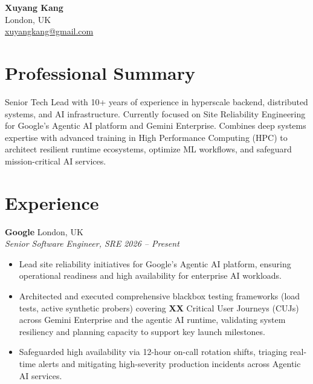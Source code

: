\documentclass[10pt,a4paper]{article}
\newcommand{\entry}[4]{
  \textbf{#1} \hfill #2 \\
  \textit{#3} \hfill \textit{#4}
}
\begin{document}
\begin{center}
    {\Huge \textbf{Xuyang Kang}} \\ \vspace{4pt}
    London, UK \\ \vspace{2pt}
    \href{mailto:xuyangkang@gmail.com}{xuyangkang@gmail.com}
\end{center}
\vspace{-6pt}

\section{Professional Summary}
Senior Tech Lead with 10+ years of experience in hyperscale backend, distributed systems, and AI infrastructure. Currently focused on Site Reliability Engineering for Google's Agentic AI platform and Gemini Enterprise. Combines deep systems expertise with advanced training in High Performance Computing (HPC) to architect resilient runtime ecosystems, optimize ML workflows, and safeguard mission-critical AI services.

\section{Experience}

\entry{Google}{London, UK}{Senior Software Engineer, SRE}{2026 -- Present}
\begin{itemize}[noitemsep, leftmargin=*]
    \item Lead site reliability initiatives for Google's Agentic AI platform, ensuring operational readiness and high availability for enterprise AI workloads.
    \item Architected and executed comprehensive blackbox testing frameworks (load tests, active synthetic probers) covering \textbf{XX} Critical User Journeys (CUJs) across Gemini Enterprise and the agentic AI runtime, validating system resiliency and planning capacity to support key launch milestones.
    \item Safeguarded high availability via 12-hour on-call rotation shifts, triaging real-time alerts and mitigating high-severity production incidents across Agentic AI services.
\end{itemize}
\vspace{3pt}
\end{document}
